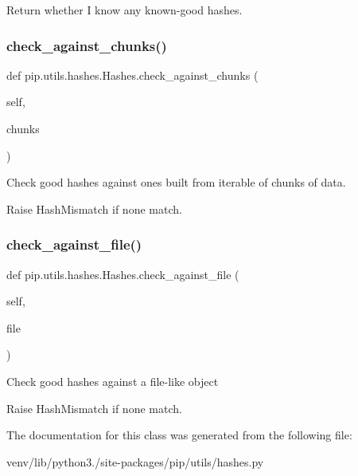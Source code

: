 \begin{DoxyVerb}Return whether I know any known-good hashes.\end{DoxyVerb}
 \mbox{\label{classpip_1_1utils_1_1hashes_1_1_hashes_aad529788518d843ce7f27f4149610411}} 
\subsubsection{\texorpdfstring{check\+\_\+against\+\_\+chunks()}{check\_against\_chunks()}}
{\footnotesize\ttfamily def pip.\+utils.\+hashes.\+Hashes.\+check\+\_\+against\+\_\+chunks (\begin{DoxyParamCaption}\item[{}]{self,  }\item[{}]{chunks }\end{DoxyParamCaption})}

\begin{DoxyVerb}Check good hashes against ones built from iterable of chunks of
data.

Raise HashMismatch if none match.\end{DoxyVerb}
 \mbox{\label{classpip_1_1utils_1_1hashes_1_1_hashes_a5066a598d8a19f1f00f1255cfea6d522}} 
\subsubsection{\texorpdfstring{check\+\_\+against\+\_\+file()}{check\_against\_file()}}
{\footnotesize\ttfamily def pip.\+utils.\+hashes.\+Hashes.\+check\+\_\+against\+\_\+file (\begin{DoxyParamCaption}\item[{}]{self,  }\item[{}]{file }\end{DoxyParamCaption})}

\begin{DoxyVerb}Check good hashes against a file-like object

Raise HashMismatch if none match.\end{DoxyVerb}
 

The documentation for this class was generated from the following file\+:\begin{DoxyCompactItemize}
\item 
venv/lib/python3./site-\/packages/pip/utils/hashes.\+py\end{DoxyCompactItemize}
